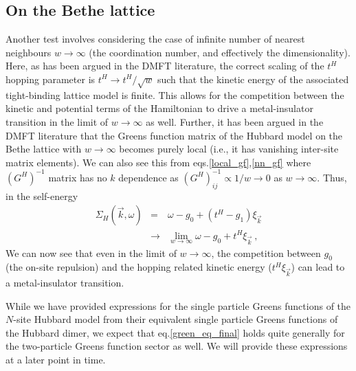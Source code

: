 \documentclass[12pt]{article}
\numberwithin{equation}{section}
\begin{document}
\subsection{On the Bethe lattice}
Another test involves considering the case of infinite number of nearest neighbours $w\to\infty$ (the coordination number, and effectively the dimensionality). Here, as has been argued in the DMFT literature, the correct scaling of the $t^{H}$ hopping parameter is $t^{H}\to t^{H}/\sqrt{w}$ such that the kinetic energy of the associated tight-binding lattice model is finite. This allows for the competition between the kinetic and potential terms of the Hamiltonian to drive a metal-insulator transition in the limit of $w\to\infty$ as well. Further, it has been argued in the DMFT literature that the Greens function matrix of the Hubbard model on the Bethe lattice with $w\to\infty$ becomes purely local (i.e., it has vanishing inter-site matrix elements). We can also see this from eqs.\eqref{local_gf},\eqref{nn_gf} where $(G^{H})^{-1}$ matrix has no $k$ dependence as $(G^{H})^{-1}_{ij}\propto 1/w \to 0$ as $w\to\infty$. Thus, in the self-energy 
\begin{eqnarray}
\Sigma_{H} (\vec{k},\omega) &=& \omega - g_{0} + (t^{H} - g_{1})\xi_{\vec{k}}\nonumber\\
&\to & \lim_{w\to\infty} \omega - {g}_{0} + t^{H}\xi_{\vec{k}}~,
\end{eqnarray}
We can now see that even in the limit of $w\to\infty$, the competition between ${g}_{0}$ (the on-site repulsion) and the hopping related kinetic energy ($t^{H}\xi_{\vec{k}}$) can lead to a metal-insulator transition.
\par\noindent
While we have provided expressions for the single particle Greens functions of the $N$-site Hubbard model from their equivalent single particle Greens functions of the Hubbard dimer, we expect that eq.\eqref{green_eq_final} holds quite generally for the two-particle Greens function sector as well. We will provide these expressions at a later point in time. 
\newpage
\end{document}
